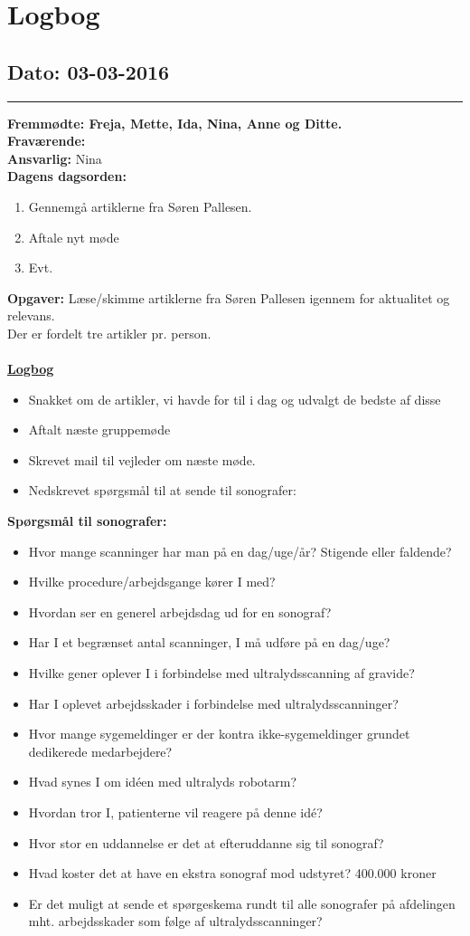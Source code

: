\chapter{Logbog}
\section{Dato: 03-03-2016}
\hrule
\textbf{Fremmødte: Freja, Mette, Ida, Nina, Anne og Ditte.} \\
\textbf{Fraværende: } \\
\textbf{Ansvarlig: }Nina  \\
\textbf{Dagens dagsorden: }
\begin{enumerate}
	\item Gennemgå artiklerne fra Søren Pallesen.
	\item Aftale nyt møde
	\item Evt. 
\end{enumerate}

\textbf{Opgaver:} \newline
Læse/skimme artiklerne fra Søren Pallesen igennem for aktualitet og relevans. \\
Der er fordelt tre artikler pr. person.\\\\
\underline{\textbf{Logbog}}
\begin{itemize}
\item Snakket om de artikler, vi havde for til i dag og udvalgt de bedste af disse
\item Aftalt næste gruppemøde
\item Skrevet mail til vejleder om næste møde.
\item Nedskrevet spørgsmål til at sende til sonografer:
\end{itemize}
\textbf{Spørgsmål til sonografer:}
\begin{itemize}
\item Hvor mange scanninger har man på en dag/uge/år? Stigende eller faldende?
\item Hvilke procedure/arbejdsgange kører I med?
\item Hvordan ser en generel arbejdsdag ud for en sonograf?
\item Har I et begrænset antal scanninger, I må udføre på en dag/uge?
\item Hvilke gener oplever I i forbindelse med ultralydsscanning af gravide?
\item Har I oplevet arbejdsskader i forbindelse med ultralydsscanninger?
\item Hvor mange sygemeldinger er der kontra ikke-sygemeldinger grundet dedikerede medarbejdere?
\item Hvad synes I om idéen med ultralyds robotarm?
\item Hvordan tror I, patienterne vil reagere på denne idé?
\item Hvor stor en uddannelse er det at efteruddanne sig til sonograf?
\item Hvad koster det at have en ekstra sonograf mod udstyret?
400.000 kroner
\item Er det muligt at sende et spørgeskema rundt til alle sonografer på afdelingen mht. arbejdsskader som følge af ultralydsscanninger?
\end{itemize}
